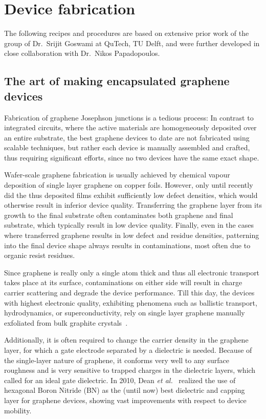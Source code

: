 \section{Device fabrication}
\label{sec:fabrication}

The following recipes and procedures are based on extensive prior work of the group of Dr.~Srijit Goswami at QuTech, TU Delft, and were further developed in close collaboration with Dr.~Nikos Papadopoulos.

\subsection{The art of making encapsulated graphene devices}

Fabrication of graphene Josephson junctions is a tedious process:
% 
In contrast to integrated circuits, where the active materials are homogeneously deposited over an entire substrate, the best graphene devices to date are not fabricated using scalable techniques, but rather each device is manually assembled and crafted, thus requiring significant efforts, since no two devices have the same exact shape.

Wafer-scale graphene fabrication is usually achieved by chemical vapour deposition of single layer graphene on copper foils.
% 
However, only until recently did the thus deposited films exhibit sufficiently low defect densities, which would otherwise result in inferior device quality.
% 
Transferring the graphene layer from its growth to the final substrate often contaminates both graphene and final substrate, which typically result in low device quality.
% 
Finally, even in the cases where transferred graphene results in low defect and residue densities, patterning into the final device shape always results in contaminations, most often due to organic resist residues.

Since graphene is really only a single atom thick and thus all electronic transport takes place at its surface, contaminations on either side will result in charge carrier scattering and degrade the device performance.
% 
Till this day, the devices with highest electronic quality, exhibiting phenomena such as ballistic transport, hydrodynamics, or superconductivity, rely on single layer graphene manually exfoliated from bulk graphite crystals~\cite{???,???,???}.


Additionally, it is often required to change the carrier density in the graphene layer, for which a gate electrode separated by a dielectric is needed.
% 
Because of the single-layer nature of graphene, it conforms very well to any surface roughness and is very sensitive to trapped charges in the dielectric layers, which called for an ideal gate dielectric.
% 
In 2010, Dean \textit{et al.}~\cite{dean_boron_2010} realized the use of hexagonal Boron Nitride (BN) as the (until now) best dielectric and capping layer for graphene devices, showing vast improvements with respect to device mobility.

